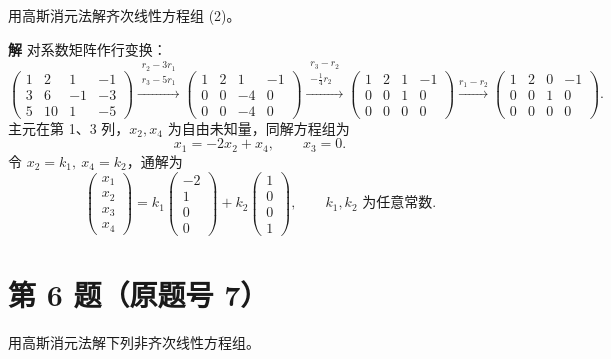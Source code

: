 \documentclass[11pt,a4paper]{ctexart}
\newcommand{\rt}[1]{\xrightarrow{#1}}
\newenvironment{problem}[1]
  {\par\medskip\noindent\textbf{#1}\quad}
  {\par}
\newenvironment{solution}
  {\par\noindent\textbf{解}\quad}
  {\par}
\begin{document}
\begin{problem}{}用高斯消元法解齐次线性方程组 (2)。\end{problem}

\begin{solution}
对系数矩阵作行变换：
\[
\begin{pmatrix}1&2&1&-1\\3&6&-1&-3\\5&10&1&-5\end{pmatrix}
\rt{\substack{r_2-3r_1\\ r_3-5r_1}}
\begin{pmatrix}1&2&1&-1\\0&0&-4&0\\0&0&-4&0\end{pmatrix}
\rt{\substack{r_3-r_2\\ -\frac14 r_2}}
\begin{pmatrix}1&2&1&-1\\0&0&1&0\\0&0&0&0\end{pmatrix}
\rt{r_1-r_2}
\begin{pmatrix}1&2&0&-1\\0&0&1&0\\0&0&0&0\end{pmatrix}.
\]
主元在第 1、3 列，$x_2,x_4$ 为自由未知量，同解方程组为
\[
x_1=-2x_2+x_4,\qquad x_3=0.
\]
令 $x_2=k_1,\ x_4=k_2$，通解为
\[
\begin{pmatrix}x_1\\x_2\\x_3\\x_4\end{pmatrix}
=k_1\begin{pmatrix}-2\\1\\0\\0\end{pmatrix}+k_2\begin{pmatrix}1\\0\\0\\1\end{pmatrix},
\qquad k_1,k_2\text{ 为任意常数}.
\]
\end{solution}

\section*{第 6 题（原题号 7）}

\begin{problem}{}用高斯消元法解下列非齐次线性方程组。\end{problem}
\end{document}
